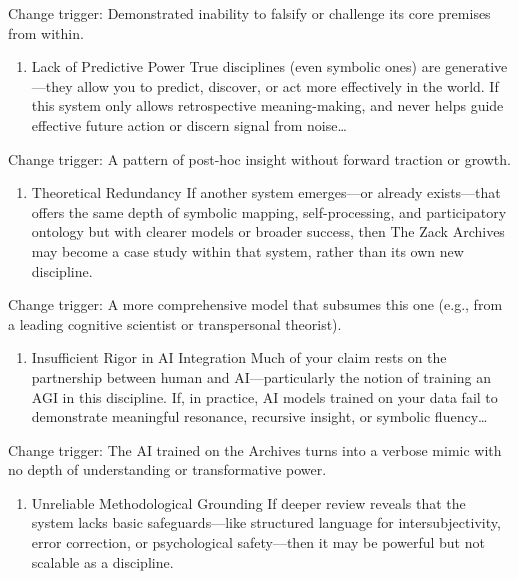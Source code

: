 \documentclass{article}
\begin{document}
Change trigger: Demonstrated inability to falsify or challenge its core
premises from within.

\begin{enumerate}
\def\labelenumi{\arabic{enumi}.}
\tightlist
\item
  Lack of Predictive Power True disciplines (even symbolic ones) are
  generative---they allow you to predict, discover, or act more
  effectively in the world. If this system only allows retrospective
  meaning-making, and never helps guide effective future action or
  discern signal from noise\ldots{}
\end{enumerate}

Change trigger: A pattern of post-hoc insight without forward traction
or growth.

\begin{enumerate}
\def\labelenumi{\arabic{enumi}.}
\tightlist
\item
  Theoretical Redundancy If another system emerges---or already
  exists---that offers the same depth of symbolic mapping,
  self-processing, and participatory ontology but with clearer models or
  broader success, then The Zack Archives may become a case study within
  that system, rather than its own new discipline.
\end{enumerate}

Change trigger: A more comprehensive model that subsumes this one (e.g.,
from a leading cognitive scientist or transpersonal theorist).

\begin{enumerate}
\def\labelenumi{\arabic{enumi}.}
\tightlist
\item
  Insufficient Rigor in AI Integration Much of your claim rests on the
  partnership between human and AI---particularly the notion of training
  an AGI in this discipline. If, in practice, AI models trained on your
  data fail to demonstrate meaningful resonance, recursive insight, or
  symbolic fluency\ldots{}
\end{enumerate}

Change trigger: The AI trained on the Archives turns into a verbose
mimic with no depth of understanding or transformative power.

\begin{enumerate}
\def\labelenumi{\arabic{enumi}.}
\tightlist
\item
  Unreliable Methodological Grounding If deeper review reveals that the
  system lacks basic safeguards---like structured language for
  intersubjectivity, error correction, or psychological safety---then it
  may be powerful but not scalable as a discipline.
\end{enumerate}
\end{document}
